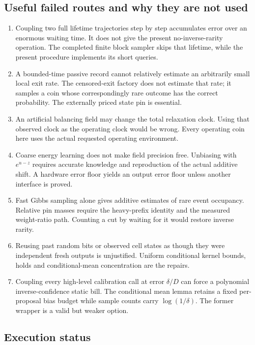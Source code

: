 \subsection{Useful failed routes and why they are not used}

\begin{enumerate}
\item Coupling two full lifetime trajectories step by step accumulates
error over an enormous waiting time. It does not give the present
no-inverse-rarity operation. The completed finite block sampler skips
that lifetime, while the present procedure implements its short queries.
\item A bounded-time passive record cannot relatively estimate an
arbitrarily small local exit rate. The censored-exit factory does not
estimate that rate; it samples a coin whose correspondingly rare outcome
has the correct probability. The externally priced state pin is essential.
\item An artificial balancing field may change the total relaxation
clock. Using that observed clock as the operating clock would be wrong.
Every operating coin here uses the actual requested operating environment.
\item Coarse energy learning does not make field precision free.
Unbiasing with $e^{u-z}$ requires accurate knowledge and reproduction of
the actual additive shift. A hardware error floor yields an output
error floor unless another interface is proved.
\item Fast Gibbs sampling alone gives additive estimates of rare event
occupancy. Relative pin masses require the heavy-prefix identity and
the measured weight-ratio path. Counting a cut by waiting for it would
restore inverse rarity.
\item Reusing past random bits or observed cell states as though they
were independent fresh outputs is unjustified. Uniform conditional
kernel bounds, holds and conditional-mean concentration are the repairs.
\item Coupling every high-level calibration call at error $\delta/D$
can force a polynomial inverse-confidence static bill. The conditional
mean lemma retains a fixed per-proposal bias budget while sample counts
carry $\log(1/\delta)$. The former wrapper is a valid but weaker option.
\end{enumerate}

\subsection{Execution status}

